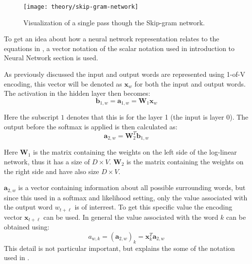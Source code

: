 \begin{figure}[H]
	\centering
	\texttt{[image: theory/skip-gram-network]}
	\caption{Visualization of a single pass though the Skip-gram network.}
\end{figure}

To get an idea about how a neural network representation relates to the equations in \cite{word2vec-details}, a vector notation of the scalar notation used in introduction to Neural Network section is used.

As previously discussed the input and output words are represented using 1-of-V encoding, this vector will be denoted as $\mathbf{x}_w$ for both the input and output words. The activation in the hidden layer then becomes:
\begin{equation}
\mathbf{b}_{1,w} = \mathbf{a}_{1,w} = \mathbf{W}_{1} \mathbf{x}_w
\end{equation}

Here the subscript $1$ denotes that this is for the layer 1 (the input is layer 0). The output before the softmax is applied is then calculated as:
\begin{equation}
\mathbf{a}_{2,w} = \mathbf{W}_2^T \mathbf{b}_{1,w}
\end{equation}

Here $\mathbf{W}_1$ is the matrix containing the weights on the left side of the log-linear network, thus it has a size of $D \times V$. $\mathbf{W}_2$ is the matrix containing the weights on the right side and have also size $D \times V$.

$\mathbf{a}_{2,w}$ is a vector containing information about all possible surrounding words, but since this used in a softmax and likelihood setting, only the value associated with the output word $w_{t + \ell}$ is of interrest. To get this specific value the encoding vector $\mathbf{x}_{t + \ell}$ can be used. In general the value associated with the word $k$ can be obtained using:
\begin{equation}
a_{w,k} = \left(\mathbf{a}_{2,w}\right)_k = \mathbf{x}_{k}^T \mathbf{a}_{2,w}
\end{equation}
This detail is not particular important, but explains the some of the notation used in \cite{word2vec-details}.


